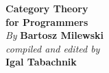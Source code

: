 

\ifdefined\HCode
\else
	\thispagestyle{empty}

	\vspace*{80pt}

	\begin{raggedleft}
		\fontsize{24pt}{24pt}\selectfont
		\textbf{Category Theory \\ for Programmers}\\
		\ifdefined{}
		\fi
		\vspace*{1cm}
		\fontsize{16pt}{18pt}\selectfont \textit{By } \textbf{Bartosz Milewski}\\
		\vspace{1cm}
		\fontsize{12pt}{14pt}\selectfont \textit{compiled and edited by}\\ \textbf{Igal Tabachnik}\\

	\end{raggedleft}


	\newpage
\fi

\vspace*{0.3\textheight}
\thispagestyle{empty}


